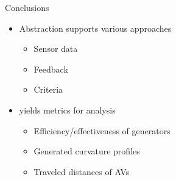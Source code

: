 \begin{frame}{Conclusions}
    \begin{itemize}
        \item Abstraction supports various approaches
            \begin{itemize}
                \item Sensor data
                \item Feedback
                \item Criteria
            \end{itemize}
        \pause%
        \item \drivebuild{} yields metrics for analysis
            \begin{itemize}
                \item Efficiency/effectiveness of generators
                \item Generated curvature profiles
                \item Traveled distances of AVs
            \end{itemize}
    \end{itemize}
\end{frame}
